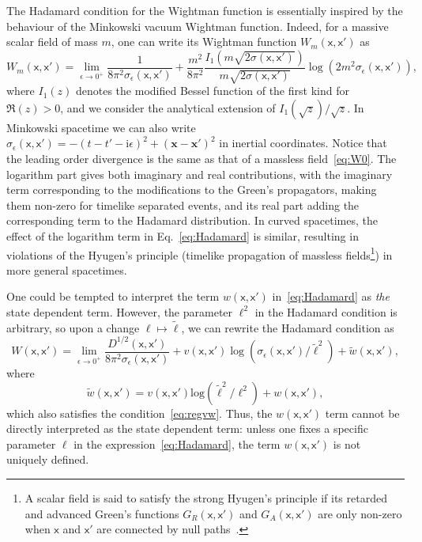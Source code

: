 \documentclass[letterpaper,12pt,titlepage,oneside,final]{book}
\newcommand{\mf}{\mathsf}%
\newcommand{\ii}{\mathrm{i}}
\begin{document}
The Hadamard condition for the Wightman function is essentially inspired by the behaviour of the Minkowski vacuum Wightman function. Indeed, for a massive scalar field of mass $m$, one can write its Wightman function $W_m(\mf x, \mf x')$ as
\begin{equation}\label{eq:Wm}
    W_m(\mf x, \mf x') = \lim_{\epsilon\to 0^+} \frac{1}{8 \pi^2 \sigma_\epsilon(\mf x, \mf x')} + \frac{m^2}{8 \pi^2} \frac{I_1(m \sqrt{2 \sigma(\mf x, \mf x')})}{m \sqrt{2\sigma(\mf x, \mf x')}}\log(2m^2 \sigma_\epsilon(\mf x, \mf x')),
\end{equation}
where $I_1(z)$ denotes the modified Bessel function of the first kind for $\Re(z)>0$, and we consider the analytical extension of $I_1(\sqrt{z})/\sqrt{z}$. In Minkowski spacetime we can also write $\sigma_\epsilon(\mf x, \mf x') = -(t-t'-\ii \epsilon)^2 + (\bm x - \bm x')^2$ in inertial coordinates. Notice that the leading order divergence is the same as that of a massless field~\eqref{eq:W0}. The logarithm part gives both imaginary and real contributions, with the imaginary term corresponding to the modifications to the Green's propagators, making them non-zero for timelike separated events, and its real part adding the corresponding term to the Hadamard distribution. In curved spacetimes, the effect of the logarithm term in Eq.~\eqref{eq:Hadamard} is similar, resulting in violations of the Hyugen's principle (timelike propagation of massless fields\footnote{A scalar field is said to satisfy the strong Hyugen's principle if its retarded and advanced Green's functions $G_R(\mf x, \mf x')$ and $G_A(\mf x, \mf x')$ are only non-zero when $\mf x$ and $\mf x'$ are connected by null paths~\cite{RayHyugens,Hyugens1,Huygens2}.}) in more general spacetimes.

One could be tempted to interpret the term $w(\mf x, \mf x')$ in~\eqref{eq:Hadamard} as \textit{the} state dependent term. However, the parameter $\ell^2$ in the Hadamard condition is arbitrary, so upon a change $\ell \mapsto \tilde{\ell}$, we can rewrite the Hadamard condition as
\begin{equation}
    W(\mf x, \mf x') = \lim_{\epsilon \to 0^+}\frac{D^{1/2}(\mf x, \mf x')}{8 \pi^2 \sigma_{\epsilon}(\mf x, \mf x')} + v(\mf x, \mf x') \log(\sigma_\epsilon(\mf x, \mf x')/\tilde{\ell}^2) + \tilde{w}(\mf x, \mf x'),
\end{equation}
where
\begin{equation}
    \tilde{w}(\mf x, \mf x') = v(\mf x, \mf x') \text{log}(\tilde{\ell}^2/\ell^2) + w(\mf x, \mf x'),
\end{equation}
which also satisfies the condition~\eqref{eq:regvw}. Thus, the $w(\mf x, \mf x')$ term cannot be directly interpreted as the state dependent term: unless one fixes a specific parameter $\ell$ in the expression~\eqref{eq:Hadamard}, the term $w(\mf x, \mf x')$ is not uniquely defined.
\end{document}
